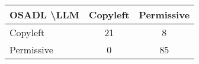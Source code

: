\begin{tabular}{l|cc}\hline
	\textbf{OSADL \textbackslash LLM} & Copyleft & Permissive\\\hline
	Copyleft & 21 & 8\\
	Permissive & 0 & 85\\\hline
\end{tabular}

